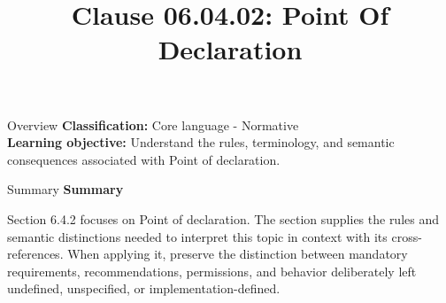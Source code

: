\documentclass[10pt,letterpaper]{article}
\title{Clause 06.04.02: Point Of Declaration}
\author{}
\date{}
\begin{document}
\maketitle
\begin{CornellOverviewBox}{Overview}
\textbf{Classification:} Core language - Normative\\[2pt]
\textbf{Learning objective:} Understand the rules, terminology, and semantic consequences associated with Point of declaration.
\end{CornellOverviewBox}\begin{CornellSummaryBox}{Summary}
{\sffamily\bfseries\color{Accent} Summary}\par\vspace{3pt}Section 6.4.2 focuses on Point of declaration. The section supplies the rules and semantic distinctions needed to interpret this topic in context with its cross-references. When applying it, preserve the distinction between mandatory requirements, recommendations, permissions, and behavior deliberately left undefined, unspecified, or implementation-defined.
\end{CornellSummaryBox}
\end{document}
